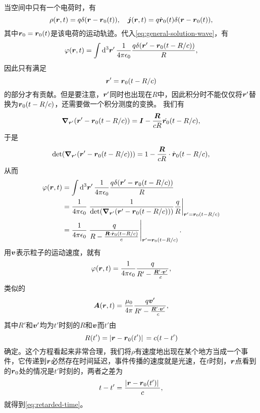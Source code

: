 \documentclass[UTF8, a4paper]{ctexart}
\begin{document}
当空间中只有一个电荷时，有
\[
    \rho(\vb*{r}, t) = q \delta(\vb*{r} - \vb*{r}_0(t)), \quad \vb*{j}(\vb*{r}, t) = q \dot{\vb*{r}}_0(t) \delta(\vb*{r} - \vb*{r}_0(t)),
\]
其中$\vb*{r}_0 = \vb*{r}_0(t)$是该电荷的运动轨迹。代入\eqref{eq:general-solution-wave}，有
\[
    \varphi(\vb*{r}, t) = \int \dd[3]{\vb*{r}'} \frac{1}{4\pi \epsilon_0} \frac{q \delta(\vb*{r}' - \vb*{r}_0(t - R / c))}{R},
\]
因此只有满足
\begin{equation}
    \vb*{r}' = \vb*{r}_0(t - R/c)
    \label{eq:retarded-position-original}
\end{equation}
的部分才有贡献。但是要注意，$\vb*{r}'$同时也出现在$R$中，因此积分时不能仅仅将$\vb*{r}'$替换为$\vb*{r}_0(t-R/c)$，还需要做一个积分测度的变换。
我们有
\[
    \grad_{\vb*{r}'} {(\vb*{r}' - \vb*{r}_0(t - R/c))} = \vb*{I} - \frac{\vb*{R}}{cR} \dot{\vb*{r}_0}(t-R/c) ,
\]
于是
\[
    \det(\grad_{\vb*{r}'} {(\vb*{r}' - \vb*{r}_0(t - R/c))}) = 1 - \frac{\vb*{R}}{cR} \cdot \dot{\vb*{r}}_0(t-R/c),
\]
从而
\[
    \begin{aligned}
        \varphi(\vb*{r}, t) &= \int \dd[3]{\vb*{r}'} \frac{1}{4\pi \epsilon_0} \frac{q \delta(\vb*{r}' - \vb*{r}_0(t - R / c))}{R} \\
        &= \frac{1}{4\pi \epsilon_0} \eval{\frac{1}{\det(\grad_{\vb*{r}'} {(\vb*{r}' - \vb*{r}_0(t - R/c))})} \frac{q}{R}}_{\vb*{r}' = \vb*{r}_0(t - R/c)} \\
        &= \frac{1}{4\pi \epsilon_0} \eval{\frac{q}{R - \frac{\vb*{R} \cdot \dot{\vb*{r}}_0(t-R/c)}{c}}}_{\vb*{r}' = \vb*{r}_0(t - R/c)}.
    \end{aligned}
\]
用$\vb*{v}$表示粒子的运动速度，就有
\begin{equation}
    \varphi(\vb*{r}, t) = \frac{1}{4\pi \epsilon_0} \frac{q}{R' - \frac{\vb*{R}' \cdot \vb*{v}'}{c}},
    \label{eq:retarded-phi}
\end{equation}
类似的
\begin{equation}
    \vb*{A}(\vb*{r}, t) = \frac{\mu_0}{4\pi} \frac{q \vb*{v}'}{R' - \frac{\vb*{R}' \cdot \vb*{v}'}{c}},
    \label{eq:retarded-a}
\end{equation}
其中$R'$和$\vb*{v}'$均为$t'$时刻的$R$和$\vb*{v}$而$t'$由
\begin{equation}
    R(t') = \abs*{\vb*{r} - \vb*{r}_0(t')} = c(t-t')
    \label{eq:retarded-time}
\end{equation}
确定。这个方程看起来非常合理，我们将$\rho$有速度地出现在某个地方当成一个事件，它传递到$\vb*{r}$必然存在时间延迟，事件传播的速度就是光速，在$t$时刻，$\vb*{r}$点看到的$\vb*{r}_0$处的情况是$t'$时刻的，两者之差为
\[
    t - t' = \frac{\abs*{\vb*{r} - \vb*{r}_0(t')}}{c},
\]
就得到\eqref{eq:retarded-time}。
\end{document}
